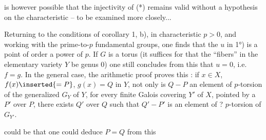 is however possible that the injectivity of (*) remains valid without a hypothesis on the characteristic -- to be examined more closely...

Returning to the conditions of corollary 1, b), in characteristic $p>0$, and working with the prime-to-$p$ fundamental groups, one finds that the $u$ in 1°) is a point  of order a power of $p$. If $G$ is a torus (it suffices for  that the ``fibers'' in the elementary variety $Y$ be  genus 0) one still concludes from this that $u=0$, i.e. $f=g$. In the general case, the arithmetic proof proves  this : if $x\in X$,   $f(x)\inserted{=P}$, $g(x)=Q$ in $Y$, not only is $Q-P$ an element of $p$-torsion of the generalized  $G_Y$ of $Y$, for every finite Galois  covering $Y'$ of $X$,  pointed by a $P'$ over $P$, there exists $Q'$ over $Q$ such that $Q'-P'$ is an element of ? $p$-torsion of $G_{Y'}$.

 could be that one could deduce $P=Q$ from this

